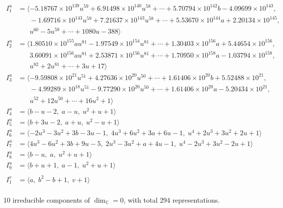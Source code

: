 \documentclass[1p]{elsarticle_modified}
\theoremstyle{definition}
\begin{document}
\begin{align*}
I^u_{1}&=\langle 
-5.18767\times10^{139} u^{59}+6.91498\times10^{140} u^{58}+\cdots+5.70794\times10^{142} b-4.09699\times10^{143},\\
\phantom{I^u_{1}}&\phantom{= \langle  }-1.69716\times10^{143} u^{59}+7.21637\times10^{143} u^{58}+\cdots+5.53670\times10^{144} a+2.20134\times10^{145},\\
\phantom{I^u_{1}}&\phantom{= \langle  }u^{60}-5 u^{59}+\cdots+1080 u-388\rangle \\
I^u_{2}&=\langle 
1.80510\times10^{155} a u^{81}-1.97549\times10^{154} u^{81}+\cdots+1.30403\times10^{156} a+5.44654\times10^{156},\\
\phantom{I^u_{2}}&\phantom{= \langle  }3.60091\times10^{156} a u^{81}+2.53871\times10^{156} u^{81}+\cdots+1.70950\times10^{158} a-1.03794\times10^{158},\\
\phantom{I^u_{2}}&\phantom{= \langle  }u^{82}+2 u^{81}+\cdots+3 u+17\rangle \\
I^u_{3}&=\langle 
-9.59808\times10^{21} u^{51}+4.27636\times10^{20} u^{50}+\cdots+1.61406\times10^{20} b+5.52488\times10^{21},\\
\phantom{I^u_{3}}&\phantom{= \langle  }-4.99289\times10^{18} u^{51}-9.77290\times10^{20} u^{50}+\cdots+1.61406\times10^{20} a-5.20434\times10^{21},\\
\phantom{I^u_{3}}&\phantom{= \langle  }u^{52}+12 u^{50}+\cdots+16 u^2+1\rangle \\
I^u_{4}&=\langle 
b- u-2,\;a- u,\;u^2+u+1\rangle \\
I^u_{5}&=\langle 
b+3 u-2,\;a+u,\;u^2- u+1\rangle \\
I^u_{6}&=\langle 
-2 u^3-3 u^2+3 b-3 u-1,\;4 u^3+6 u^2+3 a+6 u-1,\;u^4+2 u^3+3 u^2+2 u+1\rangle \\
I^u_{7}&=\langle 
4 u^3-6 u^2+3 b+9 u-5,\;2 u^3-3 u^2+a+4 u-1,\;u^4-2 u^3+3 u^2-2 u+1\rangle \\
I^u_{8}&=\langle 
b- u,\;a,\;u^2+u+1\rangle \\
I^u_{9}&=\langle 
b+u+1,\;a-1,\;u^2+u+1\rangle \\
\\
I^v_{1}&=\langle 
a,\;b^2- b+1,\;v+1\rangle \\
\end{align*}
\raggedright * 10 irreducible components of $\dim_{\mathbb{C}}=0$, with total 294 representations.\\
\end{document}
